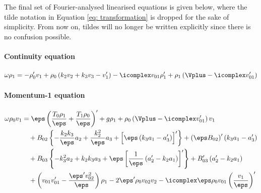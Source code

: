 The final set of Fourier-analysed linearised equations is given below, where the tilde notation in Equation \eqref{eq: transformation} is dropped for the sake of simplicity. From now on, tildes will no longer be written explicitly since there is no confusion possible.

\paragraph{Continuity equation}
{\customEquationFont
\begin{equation} \label{eq: full_continuity}
  \omega\rho_1 =
    -\rho_0' v_1 + \rho_0\left(k_2 v_2 + k_3 v_3 - v_1'\right)
    -\icomplex v_{01}\rho_1' + \rho_1 \left(\Vplus - \icomplex v_{01}'\right)
\end{equation}
}

\paragraph{Momentum-1 equation}
{\customEquationFont
\begin{equation} \label{eq: full_momentum1}
  \begin{aligned}
  \omega\rho_0 v_1 &=
    \eps\left(\frac{T_0 \rho_1}{\eps} + \frac{T_1 \rho_0}{\eps}\right)'
    + g \rho_1
    + \rho_0 \left(\Vplus - \icomplex v_{01}'\right)v_1 \\
    &\quad
		+ B_{02} \left\{
      - \frac{k_2 k_3}{\eps}a_2 + \frac{k_2^2}{\eps}a_3 + \Bigl[\eps\left(k_3a_1 - a_3'\right)\Bigr]'
    \right\}
    + \left(\eps B_{02}\right)'\left(k_3a_1 - a_3'\right)  \\
    &\quad
    + B_{03} \left\{
      -k_3^2 a_2 + k_2 k_3a_3 + \eps\left[\frac{1}{\eps}\left(a_2' - k_2 a_1 \right)\right]'
    \right\}
    + B_{03}' \left(a_2' - k_2a_1\right) \\
    &\quad
    + \left(v_{01} v_{01}' - \frac{\eps' v_{02}^2}{\eps}\right)\rho_1
		- 2 \eps' \rho_0 v_{02} v_2
    - \icomplex \eps\rho_0 v_{01} \left(\frac{v_1}{\eps}\right)'
  \end{aligned}
\end{equation}
}

